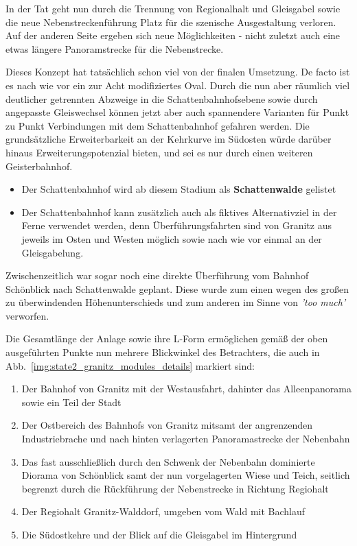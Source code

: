 In der Tat geht nun durch die Trennung von Regionalhalt und Gleisgabel sowie die neue Nebenstreckenf\"uhrung Platz f\"ur die szenische Ausgestaltung verloren.
Auf der anderen Seite ergeben sich neue M\"oglichkeiten - nicht zuletzt auch eine etwas l\"angere Panoramstrecke f\"ur die Nebenstrecke.

\clearpage

Dieses Konzept hat tats\"achlich schon viel von der finalen Umsetzung.
De facto ist es nach wie vor ein zur Acht modifiziertes Oval.
Durch die nun aber r\"aumlich viel deutlicher getrennten Abzweige in die Schattenbahnhofsebene sowie durch angepasste Gleiswechsel k\"onnen jetzt aber auch spannendere Varianten f\"ur Punkt zu Punkt Verbindungen mit dem Schattenbahnhof gefahren werden.
Die grunds\"atzliche Erweiterbarkeit an der Kehrkurve im S\"udosten w\"urde dar\"uber hinaus Erweiterungspotenzial bieten, und sei es nur durch einen weiteren Geisterbahnhof.
\begin{itemize}
	\item Der Schattenbahnhof wird ab diesem Stadium als \textbf{Schattenwalde} gelistet
	\item Der Schattenbahnhof kann zus\"atzlich auch als fiktives Alternativziel in der Ferne verwendet werden, denn \"Uberf\"uhrungsfahrten sind von Granitz aus jeweils im Osten und Westen m\"oglich sowie nach wie vor einmal an der Gleisgabelung.
\end{itemize}
Zwischenzeitlich war sogar noch eine direkte \"Uberf\"uhrung vom Bahnhof Sch\"onblick nach Schattenwalde geplant.
Diese wurde zum einen wegen des gro{\ss}en zu \"uberwindenden H\"ohenunterschieds und zum anderen im Sinne von \textit{'too much'} verworfen.

Die Gesamtl\"ange der Anlage sowie ihre L-Form erm\"oglichen gem\"a{\ss} der oben ausgef\"uhrten Punkte nun mehrere Blickwinkel des Betrachters, die auch in Abb.~\ref{img:state2_granitz_modules_details} markiert sind:
\begin{enumerate}
	\item Der Bahnhof von Granitz mit der Westausfahrt, dahinter das Alleenpanorama sowie ein Teil der Stadt
	\item Der Ostbereich des Bahnhofs von Granitz mitsamt der angrenzenden Industriebrache und nach hinten verlagerten Panoramastrecke der Nebenbahn
	\item Das fast ausschlie{\ss}lich durch den Schwenk der Nebenbahn dominierte Diorama von Sch\"onblick samt der nun vorgelagerten Wiese und Teich, seitlich begrenzt durch die R\"uckf\"uhrung der Nebenstrecke in Richtung Regiohalt
	\item Der Regiohalt Granitz-Walddorf, umgeben vom Wald mit Bachlauf
	\item Die S\"udostkehre und der Blick auf die Gleisgabel im Hintergrund
\end{enumerate}

